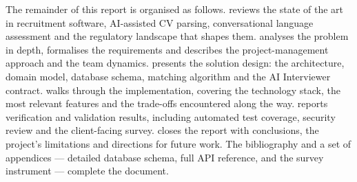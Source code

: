 The remainder of this report is organised as follows.
 reviews the state of the art in
recruitment software, AI-assisted CV parsing, conversational language
assessment and the regulatory landscape that shapes them.
 analyses the problem in depth, formalises the
requirements and describes the project-management approach and the team
dynamics.
 presents the solution design: the architecture,
domain model, database schema, matching algorithm and the AI Interviewer
contract.
 walks through the implementation,
covering the technology stack, the most relevant features and the
trade-offs encountered along the way.
 reports verification and validation results,
including automated test coverage, security review and the client-facing
survey.
 closes the report with conclusions, the
project's limitations and directions for future work.
The bibliography and a set of appendices --- detailed database schema,
full API reference, and the survey instrument --- complete the document.
